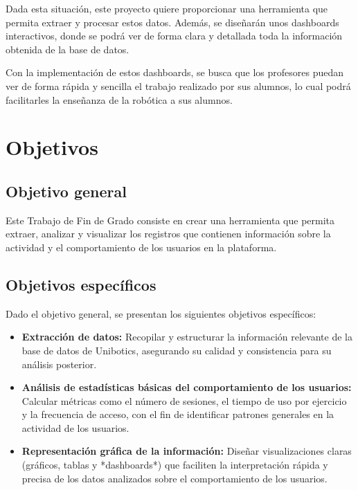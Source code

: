 \documentclass[a4paper, 12pt]{book}
\begin{document}
Dada esta situación, este proyecto quiere proporcionar una herramienta que permita extraer y procesar estos datos. Además, se diseñarán unos dashboards interactivos, donde se podrá ver de forma clara y detallada toda la información obtenida de la base de datos.

Con la implementación de estos dashboards, se busca que los profesores puedan ver de forma rápida y sencilla el trabajo realizado por sus alumnos, lo cual podrá facilitarles la enseñanza de la robótica a sus alumnos.

\section{Objetivos}
\label{sec:seccion}

\subsection{Objetivo general}
\label{sec:objetivo-general}

Este Trabajo de Fin de Grado consiste en crear una herramienta que permita extraer, analizar y visualizar los registros que contienen información sobre la actividad y el comportamiento de los usuarios en la plataforma.

\subsection{Objetivos específicos}
\label{sec:objetivos-especificos}

Dado el objetivo general, se presentan los siguientes objetivos específicos:

\begin{itemize}
    \item \textbf{Extracción de datos:} Recopilar y estructurar la información relevante de la base de datos de Unibotics, asegurando su calidad y consistencia para su análisis posterior.
    
    \item \textbf{Análisis de estadísticas básicas del comportamiento de los usuarios:} Calcular métricas como el número de sesiones, el tiempo de uso por ejercicio y la frecuencia de acceso, con el fin de identificar patrones generales en la actividad de los usuarios.
    
    \item \textbf{Representación gráfica de la información:} Diseñar visualizaciones claras (gráficos, tablas y *dashboards*) que faciliten la interpretación rápida y precisa de los datos analizados sobre el comportamiento de los usuarios.
\end{itemize}
\end{document}
